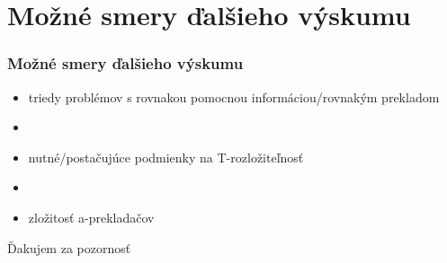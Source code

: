\documentclass[slovak]{beamer}
\begin{document}
\section{Možné smery ďalšieho výskumu}
\begin{frame}
\frametitle{Možné smery ďalšieho výskumu}

\begin{itemize}
\item triedy problémov s rovnakou pomocnou informáciou/rovnakým prekladom
\item[]
\item nutné/postačujúce podmienky na T-rozložiteľnosť
\item[]
\item zložitosť a-prekladačov
\end{itemize}
\end{frame}


\begin{frame}
\Huge{\centerline{Ďakujem za pozornosť}}
\end{frame}
\end{document}
